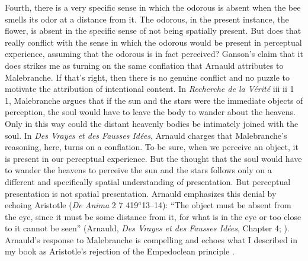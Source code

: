\documentclass[12pt]{article}
\begin{document}
Fourth, there is a very specific sense in which the odorous is absent when the bee smells its odor at a distance from it. The odorous, in the present instance, the flower, is absent in the specific sense of not being spatially present. But does that really conflict with the sense in which the odorous would be present in perceptual experience, assuming that the odorous is in fact perceived? Ganson's claim that it does strikes me as turning on the same conflation that Arnauld attributes to Malebranche. If that's right, then there is no genuine conflict and no puzzle to motivate the attribution of intentional content. In \emph{Recherche de la Vérité} iii ii 1 1, Malebranche argues that if the sun and the stars were the immediate objects of perception, the soul would have to leave the body to wander about the heavens. Only in this way could the distant heavenly bodies be intimately joined with the soul. In \emph{Des Vrayes et des Fausses Idées}, Arnauld charges that Malebranche’s reasoning, here, turns on a conflation. To be sure, when we perceive an object, it is present in our perceptual experience. But the thought that the soul would have to wander the heavens to perceive the sun and the stars follows only on a different and specifically spatial understanding of presentation. But perceptual presentation is not spatial presentation. Arnauld emphasizes this denial by echoing Aristotle (\emph{De Anima} 2 7 419\( ^{a} \)13--14): ``The object must be absent from the eye, since it must be some distance from it, for what is in the eye or too close to it cannot be seen'' (Arnauld, \emph{Des Vrayes et des Fausses Idées}, Chapter 4; \citealt[62]{Gaukroger:1990rz}). Arnauld's response to Malebranche is compelling and echoes what I described in my book as Aristotle’s rejection of the Empedoclean principle \citep[chapter 2]{Kalderon:2015fr}. 
\end{document}
